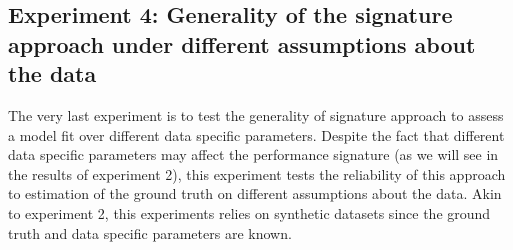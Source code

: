 


\subsection{Experiment 4:  Generality of the signature approach under different assumptions about the data}
\label{Classification}

The very last experiment is to test the generality of signature approach to assess a model fit over different data specific parameters. Despite the fact that different data specific parameters may affect the performance signature (as we will see in the results of experiment 2), this experiment tests the reliability of this approach to estimation of the ground truth on different assumptions about the data. Akin to experiment 2, this experiments relies on synthetic datasets since the ground truth and data specific parameters are known. 

